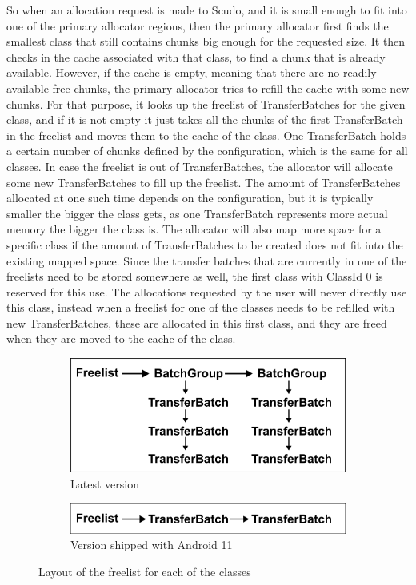 \documentclass[a4paper,11pt,oneside]{report}
\begin{document}
So when an allocation request is made to Scudo, and it is small enough to fit into
one of the primary allocator regions, then the primary allocator first finds the
smallest class that still contains chunks big enough for the requested size. It
then checks in the cache associated with that class, to find a chunk that is already
available. However, if the cache is empty, meaning that there are no readily
available free chunks, the primary allocator tries to refill the cache with some
new chunks. For that purpose, it looks up the freelist of TransferBatches for the
given class, and if it is not empty it just takes all the chunks of the first
TransferBatch in the freelist and moves them to the cache of the class. One
TransferBatch holds a certain number of chunks defined by the configuration,
which is the same for all classes.
In case the freelist is out of TransferBatches, the allocator will allocate
some new TransferBatches to fill up the freelist. The amount of TransferBatches
allocated at one such time depends on the configuration, but it is typically
smaller the bigger the class gets, as one TransferBatch represents more actual
memory the bigger the class is. The allocator will also map more space for a
specific class if the amount of TransferBatches to be created does not fit into
the existing mapped space.
Since the transfer batches that are currently in one of the freelists need to
be stored somewhere as well, the first class with ClassId 0 is reserved for
this use. The allocations requested by the user will never directly use this
class, instead when a freelist for one of the classes needs to be refilled
with new TransferBatches, these are allocated in this first class, and they
are freed when they are moved to the cache of the class.

\begin{figure}[h!]
  \centering
  \begin{subfigure}{.5\textwidth}
    \centering
    \includegraphics[width=.9\linewidth]{figures/ScudoPrimaryFreelistLatest.png}
    \caption{Latest version}
    \label{fig:ScudoPrimaryFreelistLatest}
  \end{subfigure}%
  \begin{subfigure}{.5\textwidth}
    \centering
    \includegraphics[width=.9\linewidth]{figures/ScudoPrimaryFreelistAndroid.png}
    \caption{Version shipped with Android 11}
    \label{fig:ScudoPrimaryFreelistAndroid}
  \end{subfigure}
  \caption{Layout of the freelist for each of the classes}
  \label{fig:ScudoPrimaryFreelist}
\end{figure}
\end{document}
